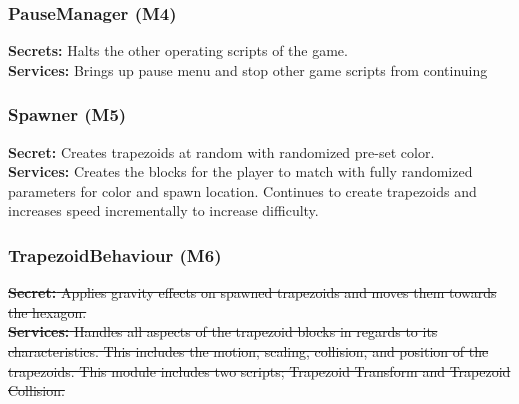 \documentclass[12pt, titlepage]{article}
\begin{document}
\subsubsection{PauseManager (M4)}
\noindent \textbf{Secrets:} Halts the other operating scripts of the game.\\
\textbf{Services:} Brings up pause menu and stop other game scripts from continuing 

\subsubsection{Spawner (M5)}
\noindent \textbf{Secret:} Creates trapezoids at random with randomized pre-set color. \\
\textbf{Services:} Creates the blocks for the player to match with fully randomized parameters for color and spawn location. Continues to create trapezoids and increases speed incrementally to increase difficulty. 

\subsubsection{TrapezoidBehaviour (M6)}
\sout{\noindent \textbf{Secret:} Applies gravity effects on spawned trapezoids and moves them towards the hexagon. \\
\textbf{Services:} Handles all aspects of the trapezoid blocks in regards to its characteristics. This includes the motion, scaling, collision, and position of the trapezoids. This module includes two scripts; Trapezoid Transform and Trapezoid Collision.}
\end{document}
